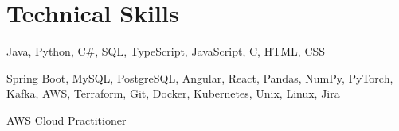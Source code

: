 \documentclass[letterpaper,11pt]{article}
\begin{document}
\section{Technical Skills}
 \begin{description}[leftmargin=!,labelwidth=\widthof{\small\textit{Programming Languages:XX}}, itemsep=0.5pt, parsep=0.5pt]
  \item[\small{Languages:}] \small Java, Python,  C\#, SQL, TypeScript, JavaScript, C, HTML, CSS
  \item[\small{Technologies \& Tools:}] \small Spring Boot, MySQL, PostgreSQL, Angular, React, Pandas, NumPy, PyTorch, Kafka, AWS, Terraform, Git, Docker, Kubernetes, Unix, Linux, Jira
  \item[\small{Certifications:}] \small AWS Cloud Practitioner
\end{description}
\vspace{-10pt}

\end{document}
